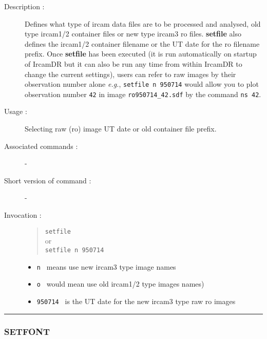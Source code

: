\begin{description}

\item[Description :] Defines what type of {\sc ircam} data files are to be
processed and analysed, old type {\sc ircam1/2} container files or new
type {\sc ircam3} {\sc ro} files.  {\bf setfile} also defines the {\sc
ircam1/2} container filename or the UT date for the {\sc ro} filename
prefix.  Once {\bf setfile} has been executed (it is run automatically
on startup of {\sc IrcamDR} but it can also be run any time from within
{\sc IrcamDR} to change the current settings), users can refer to raw
images by their observation number alone \emph{e.g.}, {\tt setfile n
950714} would allow you to plot observation number {\tt 42} in image
{\tt ro950714\_42.sdf} by the command {\tt ns 42}.

\item[Usage :] Selecting raw ({\sc ro}) image UT date or old container file 
prefix.
\item[Associated commands :] -
\item[Short version of command :] -
\item[Invocation :]

\begin{quote}{\tt  setfile }\\
or \\
{\tt setfile n 950714 }
\end{quote}

\begin{itemize}

\item {\tt n } means use new {\sc ircam3} type image names
\item {\tt o } would mean use old {\sc ircam1/2} type images names)
\item {\tt 950714 } is the UT date for the new {\sc ircam3} type raw {\sc ro} images
\end{itemize}

\end{description}

\hrule 
\subsubsection*{\label{SETFONT}SETFONT}

